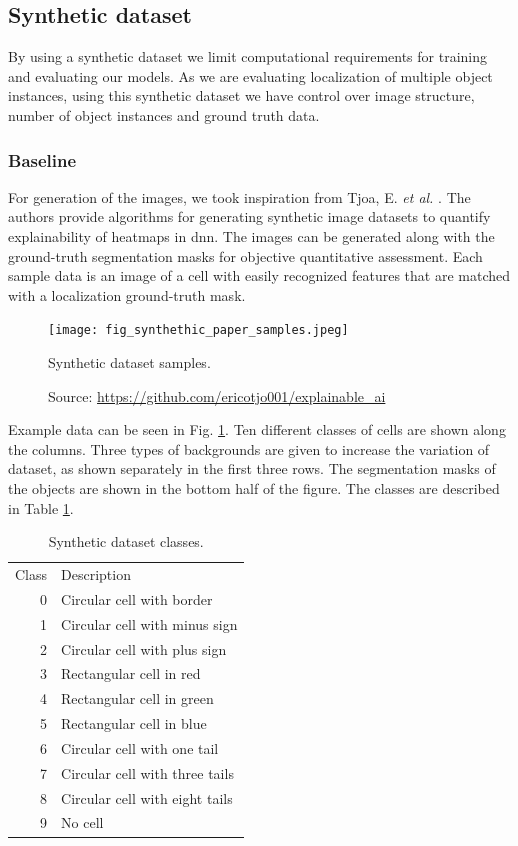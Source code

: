 \subsection{Synthetic dataset}
By using a synthetic dataset we limit computational requirements for training and evaluating our models. As we are evaluating localization of multiple object instances, using this synthetic dataset we have control over image structure, number of object instances and ground truth data. 

\subsubsection{Baseline}
For generation of the images, we took inspiration from Tjoa, E. \textit{et al.} \cite{tjoa2022quantifying}. The authors provide algorithms for generating synthetic image datasets to quantify explainability of heatmaps in \acrshort{dnn}. The images can be generated along with the ground-truth segmentation masks for objective quantitative assessment. Each sample data is an image of a cell with easily recognized features that are matched with a localization ground-truth mask.
\begin{figure}[ht]
    \begin{center}       
    \texttt{[image: fig\_synthethic\_paper\_samples.jpeg]}
    \caption[Synthetic dataset samples]{Synthetic dataset samples.}
    \caption*{Source: \href{https://github.com/ericotjo001/explainable\_ai}{https://github.com/ericotjo001/explainable\_ai}}
    \label{fig:synthetic_paper_samples}
    \end{center}
\end{figure}

Example data can be seen in Fig. \ref{fig:synthetic_paper_samples}. Ten different classes of cells are shown along the columns. Three types of backgrounds are given to increase the variation of dataset, as shown separately in the first three rows. The segmentation masks of the objects are shown in the bottom half of the figure. The classes are described in Table \ref{tab:synthetic_classes}.
\begin{table}[ht]
\centering
\begin{tabular}{rl}
  \toprule
  Class & Description \\
  \cmidrule(lr){1-2}
  0 & Circular cell with border\\
  1 & Circular cell with minus sign\\
  2 & Circular cell with plus sign\\
  3 & Rectangular cell in red\\
  4 & Rectangular cell in green\\
  5 & Rectangular cell in blue\\
  6 & Circular cell with one tail\\
  7 & Circular cell with three tails\\
  8 & Circular cell with eight tails\\
  9 & No cell\\
  \bottomrule
\end{tabular}
\caption[Synthetic dataset classes]{Synthetic dataset classes.}
\label{tab:synthetic_classes}
\end{table}

